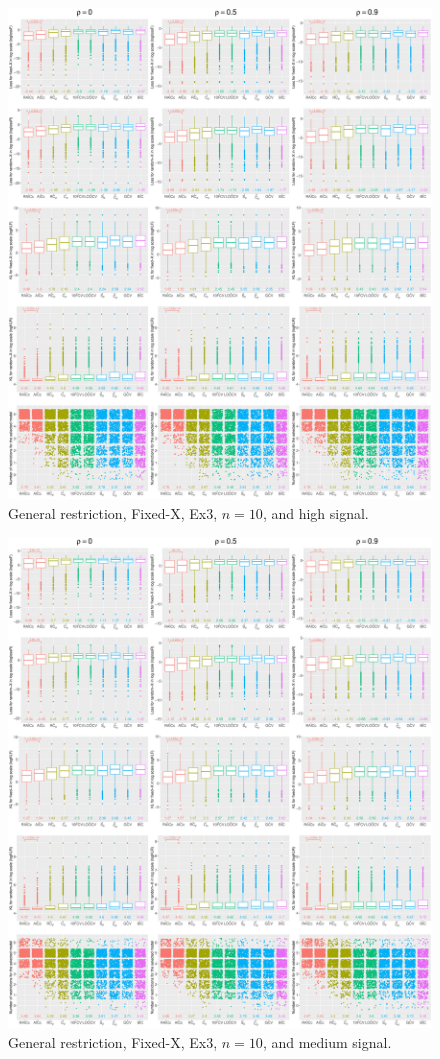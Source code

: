 \clearpage
\begin{figure}[!ht]
\centering
\includegraphics[width=\textwidth]{figures/supplement/fixedx/general_restriction/Ex3_n10_hsnr.eps}
\caption{General restriction, Fixed-X, Ex3, $n=10$, and high signal.}
\end{figure}
\clearpage
\begin{figure}[!ht]
\centering
\includegraphics[width=\textwidth]{figures/supplement/fixedx/general_restriction/Ex3_n10_msnr.eps}
\caption{General restriction, Fixed-X, Ex3, $n=10$, and medium signal.}
\end{figure}

